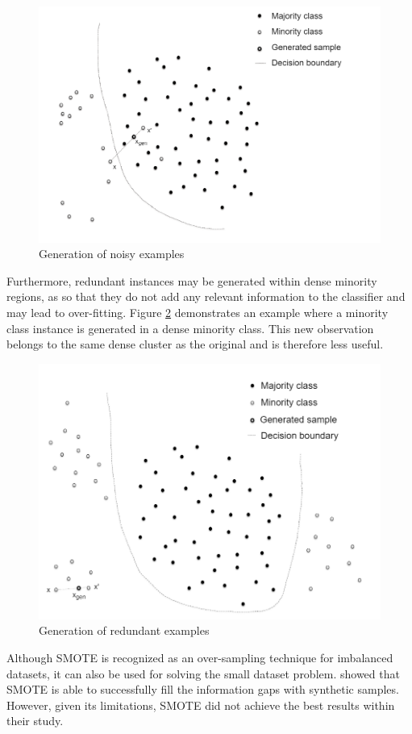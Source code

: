 \documentclass[parskip=full]{scrartcl}
\begin{document}
\begin{figure}[H]
	\centering
	\includegraphics[width=0.6\linewidth]{../analysis/noisy_examples.png}
	\caption{Generation of noisy examples \cite{Douzas.2019b}}
	\label{fig:noisy-examples}
\end{figure}

Furthermore, redundant instances may be generated within dense minority regions,
as so that they do not add any relevant information to the classifier and may
lead to over-fitting. Figure \ref{fig:redundant-examples} demonstrates an
example where a minority  class instance is generated in a dense minority class.
This new observation belongs to the same dense cluster as the original and is
therefore less useful. 

\begin{figure}[H]
	\centering
	\includegraphics[width=0.6\linewidth]{../analysis/redundant_examples.png}
	\caption{Generation of redundant examples \cite{Douzas.2019b}}
	\label{fig:redundant-examples}
\end{figure}

Although SMOTE is recognized as an over-sampling technique for imbalanced
datasets, it can also be used for solving the small dataset problem.
\cite{Li.2018} showed that SMOTE is able to successfully fill the information
gaps with synthetic samples. However, given its limitations, SMOTE did not
achieve the best results within their study.
\end{document}
